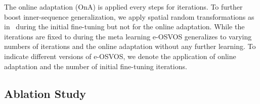 \documentclass{article}
\begin{document}
    The online adaptation (OnA) is applied every  steps for  iterations.
To further boost inner-sequence generalization, we apply spatial random transformations as in~\cite{OSVOS} during the initial fine-tuning but not for the online adaptation.
While the iterations are fixed to  during the meta learning e-OSVOS generalizes to varying numbers of iterations and the online adaptation without any further learning.
To indicate different versions of e-OSVOS, we denote the application of online adaptation and the number of initial fine-tuning iterations.

\subsection{Ablation Study}

    \begin{table*}
    \caption{
        \textbf{Ablation study} of each e-OSVOS component on the DAVIS 2017 validation set.
The first row represents a handcrafted equivalent of our test time optimization.
We present performance gains componentwise for 10 fine-tuning iterations and iteration-wise for our final e-OSVOS version.
}
    \label{tab:ablation_study}
    \centering
\end{table*}
\end{document}
